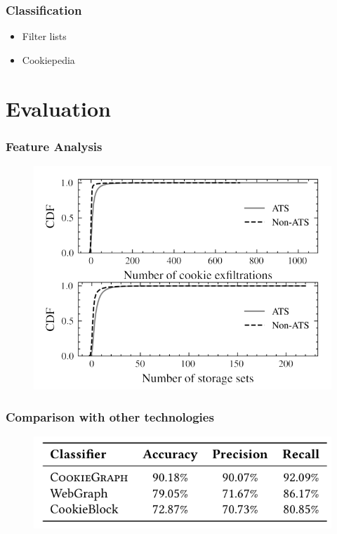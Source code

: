 \documentclass{beamer}
\begin{document}
\begin{frame}
\frametitle{Classification}
\begin{itemize}
\item Filter lists
\item Cookiepedia
\end{itemize}
\end{frame}



\section{Evaluation}

\begin{frame}
\frametitle{Feature Analysis}

\begin{figure}
\includegraphics[scale=0.3]{img/featureanalysis}
\end{figure}

\end{frame}

\begin{frame}
\frametitle{Comparison with other technologies}

\begin{figure}
\includegraphics[scale=0.5]{img/classacc}
\end{figure}

\end{frame}
\end{document}
